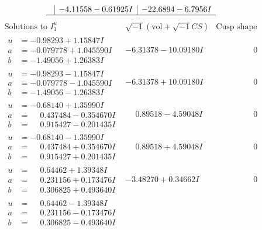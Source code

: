\documentclass[1p]{elsarticle_modified}
\theoremstyle{definition}
\newcommand{\I}{\sqrt{-1}}
\begin{document}
$$\begin{array}{c|c|c}
 & -4.11558 - 0.61925 I & -22.6894 - 6.7956 I\\
 \hline 
 \end{array}$$\newpage$$\begin{array}{c|c|c}  
\text{Solutions to }I^u_{1}& \I (\text{vol} + \sqrt{-1}CS) & \text{Cusp shape}\\
 \hline 
\begin{aligned}
u &= -0.98293 + 1.15847 I \\
a &= -0.079778 + 1.045590 I \\
b &= -1.49056 + 1.26383 I\end{aligned}
 & -6.31378 - 10.09180 I & \phantom{-0.000000 } 0 \\ \hline\begin{aligned}
u &= -0.98293 - 1.15847 I \\
a &= -0.079778 - 1.045590 I \\
b &= -1.49056 - 1.26383 I\end{aligned}
 & -6.31378 + 10.09180 I & \phantom{-0.000000 } 0 \\ \hline\begin{aligned}
u &= -0.68140 + 1.35990 I \\
a &= \phantom{-}0.437484 - 0.354670 I \\
b &= \phantom{-}0.915427 - 0.201435 I\end{aligned}
 & \phantom{-}0.89518 - 4.59048 I & \phantom{-0.000000 } 0 \\ \hline\begin{aligned}
u &= -0.68140 - 1.35990 I \\
a &= \phantom{-}0.437484 + 0.354670 I \\
b &= \phantom{-}0.915427 + 0.201435 I\end{aligned}
 & \phantom{-}0.89518 + 4.59048 I & \phantom{-0.000000 } 0 \\ \hline\begin{aligned}
u &= \phantom{-}0.64462 + 1.39348 I \\
a &= \phantom{-}0.231156 + 0.173476 I \\
b &= \phantom{-}0.306825 + 0.493640 I\end{aligned}
 & -3.48270 + 0.34662 I & \phantom{-0.000000 } 0 \\ \hline\begin{aligned}
u &= \phantom{-}0.64462 - 1.39348 I \\
a &= \phantom{-}0.231156 - 0.173476 I \\
b &= \phantom{-}0.306825 - 0.493640 I\end{aligned}

\end{array}$$
\end{document}
